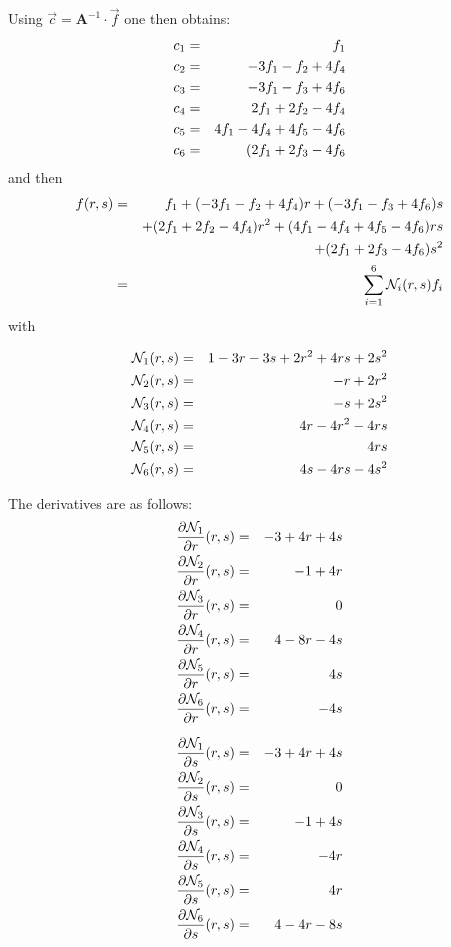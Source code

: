 Using $\vec{c}={\bm A}^{-1}\cdot \vec{f}$ one then obtains:
\begin{eqnarray}
c_1 &=& f_1 \nonumber\\
c_2 &=& -3f_1-f_2+4f_4\nonumber\\
c_3 &=& -3f_1-f_3+4f_6  \nonumber\\
c_4 &=& 2f_1+2f_2-4f_4 \nonumber\\
c_5 &=& 4f_1-4f_4+4f_5-4f_6 \nonumber\\
c_6 &=& (2f_1+2f_3-4f_6 \nonumber
\end{eqnarray}
and then
\begin{eqnarray}
f(r,s) 
&=& f_1 + (-3f_1-f_2+4f_4) r + (-3f_1-f_3+4f_6)s \nonumber\\
&& +(2f_1+2f_2-4f_4)r^2 + (4f_1-4f_4+4f_5-4f_6) rs \nonumber\\
&&+ (2f_1+2f_3-4f_6)s^2 \nonumber\\
&=& \sum_{i=1}^6 {\mathcal{N}}_i(r,s) f_i
\end{eqnarray}
with
\begin{mdframed}[backgroundcolor=blue!5]
\begin{eqnarray}
{\mathcal{N}}_1(r,s) &=& 1-3r-3s+2r^2+4rs+2s^2 \nonumber\\
{\mathcal{N}}_2(r,s) &=& -r+2r^2 \nonumber\\
{\mathcal{N}}_3(r,s) &=& -s+2s^2 \nonumber\\
{\mathcal{N}}_4(r,s) &=& 4r-4r^2-4rs \nonumber\\
{\mathcal{N}}_5(r,s) &=& 4rs \nonumber\\
{\mathcal{N}}_6(r,s) &=& 4s-4rs-4s^2 \nonumber
\end{eqnarray}
\end{mdframed}

The derivatives are as follows:
\begin{eqnarray}
\frac{\partial {\mathcal{N}}_1}{\partial r}(r,s) &=&  -3+4r+4s \nonumber\\ 
\frac{\partial {\mathcal{N}}_2}{\partial r}(r,s) &=&  -1+4r\nonumber\\ 
\frac{\partial {\mathcal{N}}_3}{\partial r}(r,s) &=&  0\nonumber\\ 
\frac{\partial {\mathcal{N}}_4}{\partial r}(r,s) &=&  4-8r-4s\nonumber\\ 
\frac{\partial {\mathcal{N}}_5}{\partial r}(r,s) &=&  4s\nonumber\\ 
\frac{\partial {\mathcal{N}}_6}{\partial r}(r,s) &=&  -4s\nonumber
\end{eqnarray}

\begin{eqnarray}
\frac{\partial {\mathcal{N}}_1}{\partial s}(r,s) &=&  -3+4r+4s\nonumber\\ 
\frac{\partial {\mathcal{N}}_2}{\partial s}(r,s) &=&  0\nonumber\\ 
\frac{\partial {\mathcal{N}}_3}{\partial s}(r,s) &=&  -1+4s\nonumber\\ 
\frac{\partial {\mathcal{N}}_4}{\partial s}(r,s) &=&  -4r\nonumber\\ 
\frac{\partial {\mathcal{N}}_5}{\partial s}(r,s) &=&  4r\nonumber\\ 
\frac{\partial {\mathcal{N}}_6}{\partial s}(r,s) &=&  4-4r-8s\nonumber
\end{eqnarray}
